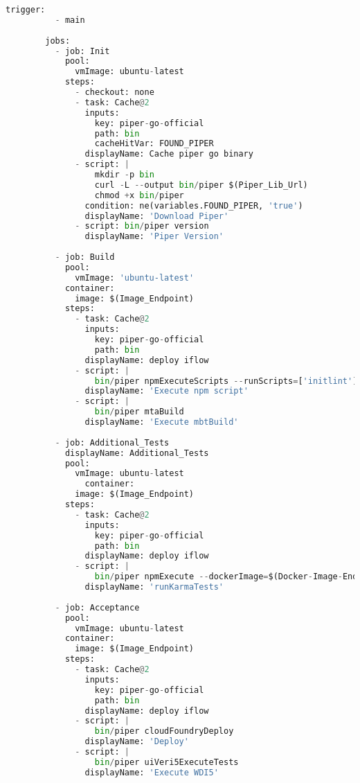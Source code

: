         \begin{lstlisting}[language=Python, breaklines=true, basicstyle=\small\ttfamily, frame=single]
          trigger:
          - main
        
        jobs:
          - job: Init
            pool:
              vmImage: ubuntu-latest
            steps:
              - checkout: none
              - task: Cache@2
                inputs:
                  key: piper-go-official
                  path: bin
                  cacheHitVar: FOUND_PIPER
                displayName: Cache piper go binary
              - script: |
                  mkdir -p bin
                  curl -L --output bin/piper $(Piper_Lib_Url)
                  chmod +x bin/piper
                condition: ne(variables.FOUND_PIPER, 'true')
                displayName: 'Download Piper'
              - script: bin/piper version
                displayName: 'Piper Version'
        
          - job: Build
            pool:
              vmImage: 'ubuntu-latest'
            container:
              image: $(Image_Endpoint) 
            steps:
              - task: Cache@2
                inputs:
                  key: piper-go-official
                  path: bin
                displayName: deploy iflow
              - script: |
                  bin/piper npmExecuteScripts --runScripts=['initlint']
                displayName: 'Execute npm script'
              - script: |
                  bin/piper mtaBuild
                displayName: 'Execute mbtBuild'
        
          - job: Additional_Tests
            displayName: Additional_Tests
            pool:
              vmImage: ubuntu-latest
                container:
              image: $(Image_Endpoint) 
            steps:
              - task: Cache@2
                inputs:
                  key: piper-go-official
                  path: bin
                displayName: deploy iflow
              - script: |
                  bin/piper npmExecute --dockerImage=$(Docker-Image-Endpoint) --npmRunCommand='run mykarma:ci'
                displayName: 'runKarmaTests'
        
          - job: Acceptance
            pool:
              vmImage: ubuntu-latest
            container:
              image: $(Image_Endpoint)   
            steps:
              - task: Cache@2
                inputs:
                  key: piper-go-official
                  path: bin
                displayName: deploy iflow
              - script: |
                  bin/piper cloudFoundryDeploy
                displayName: 'Deploy'
              - script: |
                  bin/piper uiVeri5ExecuteTests
                displayName: 'Execute WDI5'
        

\end{lstlisting}
